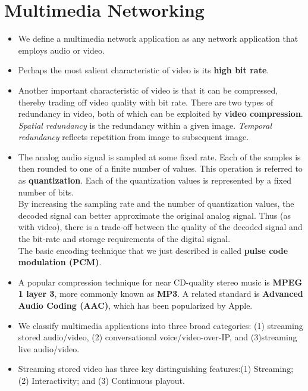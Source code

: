 \section{Multimedia Networking}
\begin{itemize}

\item
We define a multimedia network application as any network application that employs audio or video.

\item
Perhaps the most salient characteristic of video is its \textbf{high bit rate}.

\item
Another important characteristic of video is that it can be compressed, thereby trading off video quality with bit rate. There are two types of redundancy in video, both of which can be exploited by \textbf{video compression}. \textit{Spatial redundancy} is the redundancy within a given image. \textit{Temporal redundancy} reflects repetition from image to subsequent image.

\item
The analog audio signal is sampled at some fixed rate. Each of the samples is then rounded to one of a finite number of values. This operation is referred to as \textbf{quantization}. Each of the quantization values is represented by a fixed number of bits.\\
By increasing the sampling rate and the number of quantization values, the decoded signal can better approximate the original analog signal. Thus (as with video), there is a trade-off between the quality of the decoded signal and the bit-rate and storage requirements of the digital signal.\\
The basic encoding technique that we just described is called \textbf{pulse code modulation (PCM)}.

\item
A popular compression technique for near CD-quality stereo music is \textbf{MPEG 1 layer 3}, more commonly known as \textbf{MP3}. A related standard is \textbf{Advanced Audio Coding (AAC)}, which has been popularized by Apple.

\item
We classify multimedia applications into three broad categories: (1) streaming stored audio/video, (2) conversational voice/video-over-IP, and (3)streaming live audio/video.

\item
Streaming stored video has three key distinguishing features:(1) Streaming; (2) Interactivity; and (3) Continuous playout.


\end{itemize}
